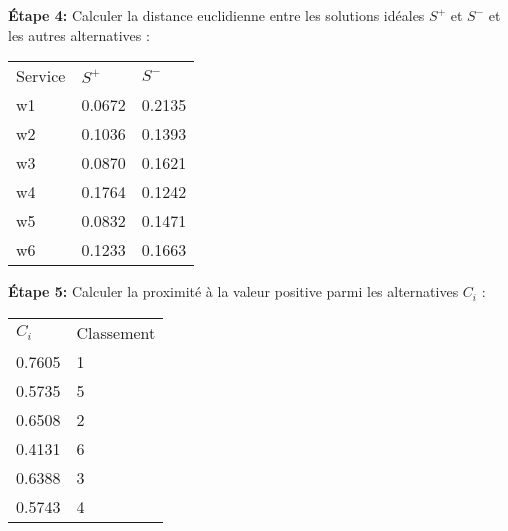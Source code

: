\documentclass[french, 11pt, a4paper, oldfontcommands]{report}
\begin{document}
		\par
		\textbf{Étape 4:} Calculer la distance euclidienne entre les solutions idéales $S^+$ et $S^-$ et les autres alternatives :
		\begin{table}[ht]
			\begin{tabular}{lll}
			\rowcolor[HTML]{9B9B9B} 
			Service & $S^+$  & $S^-$  \\
			w1      & 0.0672 & 0.2135 \\
			\rowcolor[HTML]{EFEFEF} 
			w2      & 0.1036 & 0.1393 \\
			w3      & 0.0870 & 0.1621 \\
			\rowcolor[HTML]{EFEFEF} 
			w4      & 0.1764 & 0.1242 \\
			w5      & 0.0832 & 0.1471 \\
			\rowcolor[HTML]{EFEFEF} 
			w6      & 0.1233 & 0.1663
			\end{tabular}
		\end{table}
		\par
		\textbf{Étape 5:} Calculer la proximité à la valeur positive parmi les alternatives $C_i$ : 
		\begin{table}[ht]
			\begin{tabular}{ll}
			\rowcolor[HTML]{9B9B9B} 
			$C_i$  & Classement \\
			0.7605 & 1          \\
			0.5735 & 5          \\
			\rowcolor[HTML]{EFEFEF} 
			0.6508 & 2          \\
			0.4131 & 6          \\
			\rowcolor[HTML]{EFEFEF} 
			0.6388 & 3          \\
			0.5743 & 4         
			\end{tabular}
		\end{table}
        \par
    \newpage
\end{document}
